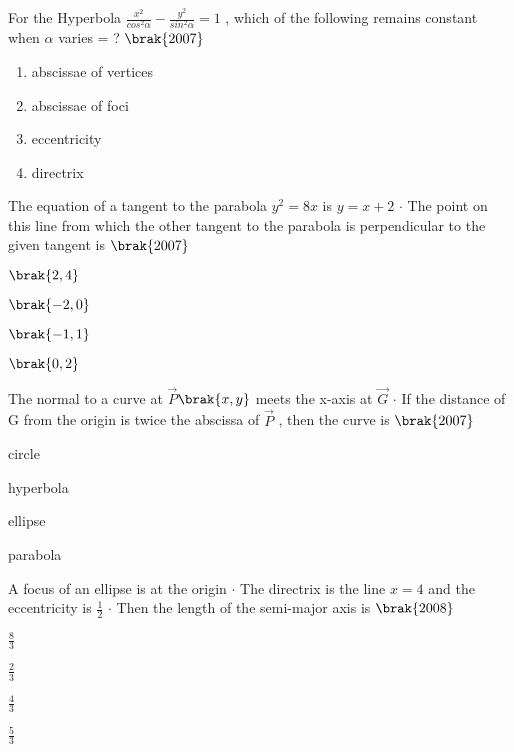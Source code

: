 \hfill
\item For the Hyperbola {$ \frac{x^2}{cos^2 \alpha} - \frac{y^2}{sin^2 \alpha} = 1 $} , which of the  following remains constant when {$ \alpha $} varies = ? 
\hfill
\hfill{{$ \brak{2007} $}}
\begin{enumerate}
\item abscissae of vertices 
\item abscissae of foci
\item eccentricity
\item directrix
\end{enumerate}
\hfill
\item The equation of a tangent to the parabola {$ y^2 = 8x $} is {$ y = x + 2 $} {$ \cdot $}  The point on this line from which the other tangent to the parabola is perpendicular to the given tangent is
\hfill 
\hfill{{$\brak{2007}$}}
\begin{enumerate}
\begin{multicols}{2}
\item {$ \brak{2,4} $}
\item {$ \brak{-2,0} $}
\item {$ \brak{-1,1} $}
\item {$ \brak{0,2} $}
\end{multicols}
\end{enumerate}
\hfill
\item The normal to a curve at {$\vec{P}$}{$ \brak{x, y} $} meets the x-axis at {$\vec{G}$} {$ \cdot $} If the distance of G from the origin is twice the abscissa of {$\vec{P}$} , then the curve is \hfill {{$ \brak{2007} $}}
\begin{enumerate}
\begin{multicols}{2}
\item circle
\item hyperbola
\item ellipse
\item parabola
\end{multicols}
\end{enumerate}
\hfill
\item  A focus of an ellipse is at the origin {$ \cdot $} The directrix is the line {$ x = 4 $} and the eccentricity is {$ \frac{1}{2} $} {$ \cdot $} Then the length of the semi-major axis is 
\hfill
\hfill { $ \brak{2008} $}
\begin{enumerate}
\begin{multicols}{2}
\item {$ \frac{8}{3} $}
\item {$ \frac{2}{3} $}
\item {$ \frac{4}{3} $}
\item {$ \frac{5}{3} $}
\end{multicols}	
\end{enumerate}



